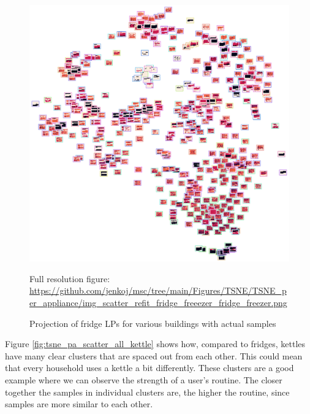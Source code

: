 \begin{figure}[H]
	\centering
	\caption{Projection of fridge LPs for various buildings with actual samples}
	\includegraphics[width=.9\textwidth]{Figures/TSNE/TSNE_per_appliance/img_scatter_refit_fridge_freeezer_fridge_freezer.png}
	\label{fig:tsne_pa_img_scatter_all_fridge}
	\par
	\par\footnotesize{Full resolution figure: \url{https://github.com/jenkoj/msc/tree/main/Figures/TSNE/TSNE_per_appliance/img_scatter_refit_fridge_freeezer_fridge_freezer.png}}
\end{figure}

Figure \ref{fig:tsne_pa_scatter_all_kettle} shows how, compared to fridges, kettles have many clear clusters that are spaced out from each other.
This could mean that every household uses a kettle a bit differently.
These clusters are a good example where we can observe the strength of a user's routine.
The closer together the samples in individual clusters are, the higher the routine, since samples are more similar to each other.

